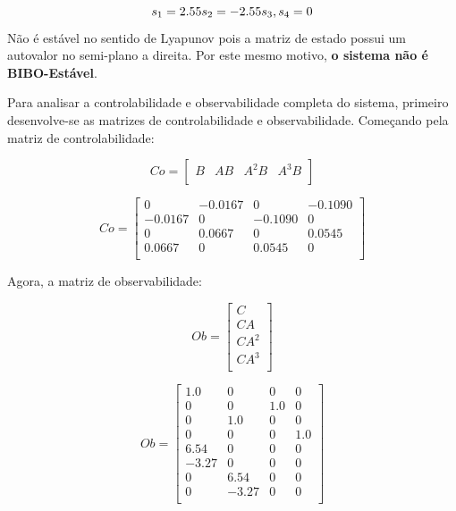 \documentclass[a4paper, 12pt]{article}
\begin{document}
\begin{equation}
     s_{1} = 2.55\\
     s_{2} = -2.55\\
     s_{3},s_{4} = 0\\
\end{equation}
Não é estável no sentido de Lyapunov pois a matriz de estado possui um autovalor no semi-plano a direita. Por este mesmo motivo, \textbf{o sistema não é BIBO-Estável}.

Para analisar a controlabilidade e observabilidade completa do sistema, primeiro desenvolve-se as matrizes de controlabilidade e observabilidade. Começando pela matriz de controlabilidade:

\begin{equation}
Co
=
\begin{bmatrix}
B & AB & A^2B & A^3B\\
\end{bmatrix}
\end{equation}

\begin{equation}
Co
=
\begin{bmatrix}
0 & -0.0167 & 0 & -0.1090\\
-0.0167 & 0 & -0.1090 & 0\\
0 & 0.0667 & 0 & 0.0545\\
0.0667 & 0 & 0.0545 & 0\\
\end{bmatrix}
\end{equation}

Agora, a matriz de observabilidade:

\begin{equation}
Ob
=
\begin{bmatrix}
C\\
CA\\
CA^2\\ 
CA^3\\
\end{bmatrix}
\end{equation}

\begin{equation}
Ob
=
\begin{bmatrix}
1.0 & 0 & 0 & 0\\
0 & 0 & 1.0 & 0\\
0 & 1.0 & 0 & 0\\
0 & 0 & 0 & 1.0\\
6.54 & 0 & 0 & 0\\
-3.27 & 0 & 0 & 0\\
0 & 6.54 & 0 & 0\\
0 & -3.27 & 0 & 0\\
\end{bmatrix}
\end{equation}
\end{document}
